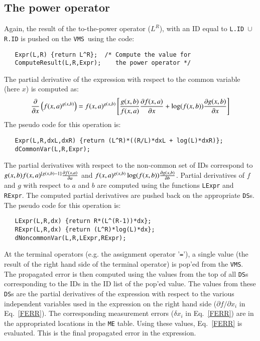 \documentclass[11pt]{article}
\newcommand{\DS}{{\tt DS}}
\newcommand{\VMS}{{\tt VMS}}
\begin{document}
%
%
\subsection{The power operator}

Again, the result of the to-the-power operator ($L^R$), with an ID
equal to {\tt L.ID $\cup$ R.ID} is pushed on the \VMS\ using the code:
\begin{verbatim}
   Expr(L,R) {return L^R};  /* Compute the value for 
   ComputeResult(L,R,Expr);    the power operator */
\end{verbatim}
The partial derivative of the expression with respect to the common
variable (here $x$) is computed as:
\begin{equation}
{\partial \over {\partial
x}}\left(f(x,a)^{g(x,b)}\right)=f(x,a)^{g(x,b)} \left[{g(x,b) \over
f(x,a)} {\partial f(x,a)  \over \partial x} + \log(f(x,b)) 
{\partial g(x,b) \over \partial x} \right] 
\end{equation}
The pseudo code for this operation is:
\begin{verbatim}
   Expr(L,R,dxL,dxR) {return (L^R)*((R/L)*dxL + log(L)*dxR)};
   dCommonVar(L,R,Expr);
\end{verbatim}
The partial derivatives with respect to the non-common set of IDs
correspond to $g(x,b)f(x,a)^{[g(x,b)-1]} {\partial f(x,a) \over
{\partial a}}$ and $f(x,a)^{g(x,b)} \log(f(x,b)) {\partial g(x,b)
\over \partial b}$.  Partial derivatives of $f$ and $g$ with respect
to $a$ and $b$ are computed using the functions {\tt LExpr} and {\tt
RExpr}.  The computed partial derivatives are pushed back on the
appropriate \DS s.  The pseudo code for this operation is:
\begin{verbatim}
   LExpr(L,R,dx) {return R*(L^(R-1))*dx};
   RExpr(L,R,dx) {return (L^R)*log(L)*dx};
   dNoncommonVar(L,R,LExpr,RExpr);
\end{verbatim}
At the terminal operators (e.g. the assignment operator '{\tt =}'), a
single value (the result of the right hand side of the terminal
operator) is pop'ed from the \VMS.  The propagated error is then
computed using the values from the top of all {\tt DS}s corresponding
to the IDs in the ID list of the pop'ed value.  The values from these
\DS s are the partial derivatives of the expression with respect
to the various independent variables used in the expression on the
right hand side ($\partial f / \partial x_i$ in Eq.~\ref{FERR}).  The
corresponding measurement errors ($\delta x_i$ in Eq.~\ref{FERR}) are
in the appropriated locations in the {\tt ME} table.  Using these
values, Eq.~\ref{FERR} is evaluated.  This is the final propagated
error in the expression.
\end{document}
